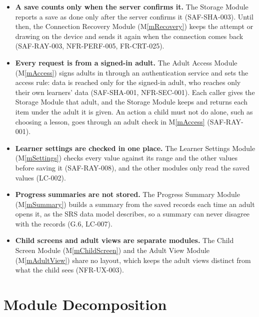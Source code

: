 \documentclass[12pt, titlepage]{article}
\newcommand{\mref}[1]{M\ref{#1}}
\begin{document}
\begin{itemize}
  (\mref{mRecord}) saves each attempt once and decides when a saved record can
  no longer change (FR-REC-008, FR-REC-009). It marks such a record when it
  saves it. The Storage Module (\mref{mStorage}) refuses to replace a marked
  item, whatever kind it is, and the Audit Log Module (\mref{mLog}) logs each
  refused change (NFR-SEC-003). Deletion follows the privacy rules still to be
  decided (OI-02).
\item \textbf{A save counts only when the server confirms it.} The Storage
  Module reports a save as done only after the server confirms it (SAF-SHA-003).
  Until then, the Connection Recovery Module (\mref{mRecovery}) keeps the
  attempt or drawing on the device and sends it again when the connection comes
  back (SAF-RAY-003, NFR-PERF-005, FR-CRT-025).
\item \textbf{Every request is from a signed-in adult.} The Adult Access Module
  (\mref{mAccess}) signs adults in through an authentication service and sets
  the access rule: data is reached only for the signed-in adult, who reaches
  only their own learners' data (SAF-SHA-001, NFR-SEC-001). Each caller gives
  the Storage Module that adult, and the Storage Module keeps and returns each
  item under the adult it is given. An action a child must not do alone, such
  as choosing a lesson, goes through an adult check in \mref{mAccess}
  (SAF-RAY-001).
\item \textbf{Learner settings are checked in one place.} The Learner Settings
  Module (\mref{mSettings}) checks every value against its range and the other
  values before saving it (SAF-RAY-008), and the other modules only read the
  saved values (LC-002).
\item \textbf{Progress summaries are not stored.} The Progress Summary Module
  (\mref{mSummary}) builds a summary from the saved records each time an adult
  opens it, as the SRS data model describes, so a summary can never disagree
  with the records (G.6, LC-007).
\item \textbf{Child screens and adult views are separate modules.} The Child
  Screen Module (\mref{mChildScreen}) and the Adult View Module
  (\mref{mAdultView}) share no layout, which keeps the adult views distinct from
  what the child sees (NFR-UX-003).
\end{itemize}

\section{Module Decomposition} \label{SecMD}
\end{document}

